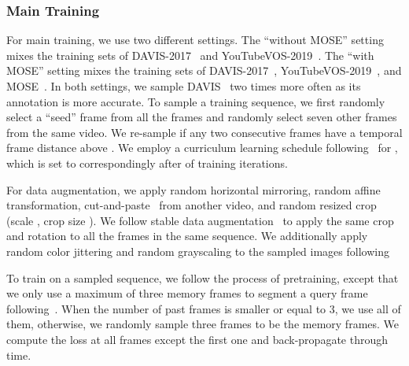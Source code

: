 \subsubsection{Main Training}
For main training, we use two different settings. 
The ``without MOSE'' setting mixes the training sets of DAVIS-2017~\cite{perazzi2016benchmark} and YouTubeVOS-2019~\cite{xu2018youtubeVOS}. 
The ``with MOSE'' setting mixes the training sets of DAVIS-2017~\cite{perazzi2016benchmark}, YouTubeVOS-2019~\cite{xu2018youtubeVOS}, and MOSE~\cite{ding2023mose}.
In both settings, we sample DAVIS~\cite{perazzi2016benchmark} two times more often as its annotation is more accurate. 
To sample a training sequence, we first randomly select a ``seed'' frame from all the frames and randomly select seven other frames from the same video. 
We re-sample if any two consecutive frames have a temporal frame distance above . We employ a curriculum learning schedule following~\cite{cheng2022xmem} for , which is set to  correspondingly after  of training iterations.

For data augmentation, we apply random horizontal mirroring, random affine transformation, cut-and-paste~\cite{ghiasi2021simple} from another video, and random resized crop (scale , crop size ).
We follow stable data augmentation~\cite{cheng2023tracking} to apply the same crop and rotation to all the frames in the same sequence.
We additionally apply random color jittering and random grayscaling to the sampled images  following~\cite{cheng2021stcn,cheng2022xmem}

To train on a sampled sequence, we follow the process of pretraining, except that we only use a maximum of three memory frames to segment a query frame following~\cite{cheng2022xmem}. When the number of past frames is smaller or equal to 3, we use all of them, otherwise, we randomly sample three frames to be the memory frames.
We compute the loss at all frames except the first one and back-propagate through time.

